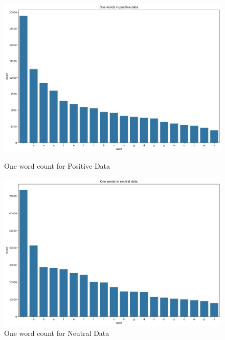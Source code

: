 \documentclass[a4paper]{article}
\theoremstyle{plain}
\theoremstyle{definition}
\begin{document}
\vspace{0.3 cm}
\begin{figure}[htbp]
    \centering
    \begin{minipage}[b]{0.3\textwidth}
        \centering
        \includegraphics[width=\textwidth]{figs/output.png}
        \caption*{One word count for Positive Data}
        \label{fig:figure3}
    \end{minipage}
    \hfill
    \begin{minipage}[b]{0.3\textwidth}
        \centering
        \includegraphics[width=\textwidth]{figs/output2.png}
        \caption*{One word count for Neutral Data}
        \label{fig:figure4}
    \end{minipage}
    \hfill
    \begin{minipage}[b]{0.3\textwidth}
        \centering

\end{minipage}
\end{figure}
\end{document}
